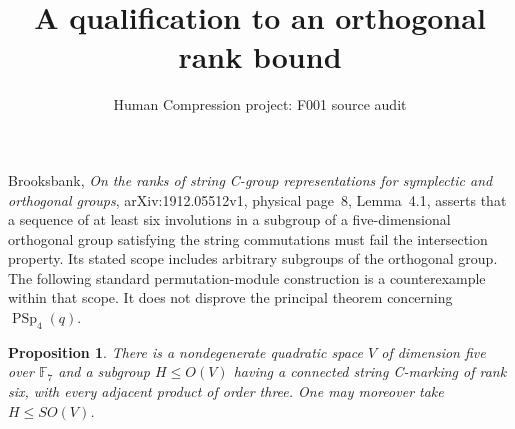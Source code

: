 \documentclass[11pt,a4paper]{article}
\title{A qualification to an orthogonal rank bound}
\author{Human Compression project: F001 source audit}\date{}
\newtheorem{proposition}{Proposition}
\begin{document}
\maketitle
Brooksbank, \emph{On the ranks of string C-group representations for
symplectic and orthogonal groups}, arXiv:1912.05512v1, physical page~8,
Lemma~4.1, asserts that a sequence of at least six involutions in a
subgroup of a five-dimensional orthogonal group satisfying the string
commutations must fail the intersection property. Its stated scope
includes arbitrary subgroups of the orthogonal group. The following
standard permutation-module construction is a counterexample within
that scope. It does not disprove the principal theorem concerning
$\operatorname{PSp}_4(q)$.

\begin{proposition}
There is a nondegenerate quadratic space $V$ of dimension five over
$\mathbb F_7$ and a subgroup $H\le O(V)$ having a connected string
C-marking of rank six, with every adjacent product of order three.
One may moreover take $H\le SO(V)$.
\end{proposition}
\end{document}
